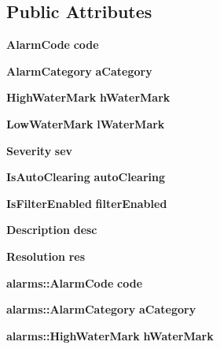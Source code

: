 \subsection*{Public Attributes}
\begin{DoxyCompactItemize}
\item 
{\bf Alarm\+Code} {\bfseries code}\label{structalarms_1_1AlarmInformation_a36872a1802face7434ce15c0207782cb}

\item 
{\bf Alarm\+Category} {\bfseries a\+Category}\label{structalarms_1_1AlarmInformation_a19f5130e32163e595426363ea186816f}

\item 
{\bf High\+Water\+Mark} {\bfseries h\+Water\+Mark}\label{structalarms_1_1AlarmInformation_a01fb84ebda291fad035f0debe5f69f6e}

\item 
{\bf Low\+Water\+Mark} {\bfseries l\+Water\+Mark}\label{structalarms_1_1AlarmInformation_adbdaaa1b928fe30496ce86188cad88fd}

\item 
{\bf Severity} {\bfseries sev}\label{structalarms_1_1AlarmInformation_ab1acc6be036148ae2dcafd22213cb9dd}

\item 
{\bf Is\+Auto\+Clearing} {\bfseries auto\+Clearing}\label{structalarms_1_1AlarmInformation_ae0ff266e57755d90c681d1ab70119bd6}

\item 
{\bf Is\+Filter\+Enabled} {\bfseries filter\+Enabled}\label{structalarms_1_1AlarmInformation_a71dc405e215cd5d456ef9e8bb76895cc}

\item 
{\bf Description} {\bfseries desc}\label{structalarms_1_1AlarmInformation_a69fa2b2168d2e9adf9e2192b9c0a0075}

\item 
{\bf Resolution} {\bfseries res}\label{structalarms_1_1AlarmInformation_a32ad6f1f28cf650b6567b0470480a819}

\item 
{\bf alarms\+::\+Alarm\+Code} {\bfseries code}\label{structalarms_1_1AlarmInformation_a1e5a0518a6a59b10d839d9a3ff493794}

\item 
{\bf alarms\+::\+Alarm\+Category} {\bfseries a\+Category}\label{structalarms_1_1AlarmInformation_af55d650a51961e7b8771746e1bb60c86}

\item 
{\bf alarms\+::\+High\+Water\+Mark} {\bfseries h\+Water\+Mark}\label{structalarms_1_1AlarmInformation_aab41c8a6e4876228637ad47b1e5a74fa}


\end{DoxyCompactItemize}
